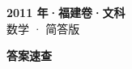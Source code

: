 \documentclass[zihao=-4, a4paper]{ctexart}
\begin{document}
\begin{center}
  {\Large\bfseries 2011 年·福建卷·文科}\\[4pt]
  {\large 数学 · 简答版}
\end{center}
\medskip
{}

\clearpage
{}
\begin{center}{\Large\bfseries 答案速查}\end{center}
\medskip

\end{document}
